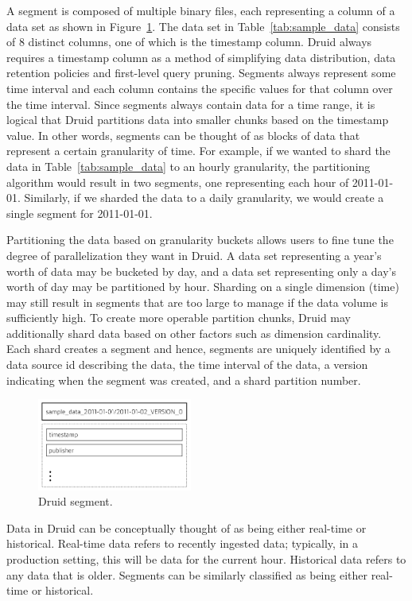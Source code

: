 \documentclass{vldb}
\begin{document}
A segment is composed of multiple binary files, each representing a
column of a data set as shown in Figure~\ref{fig:druid_segment}. The data set in Table~\ref{tab:sample_data} consists of 8 distinct
columns, one of which is the timestamp column. Druid always requires a
timestamp column as a method of simplifying data distribution, data retention policies and
first-level query pruning.  Segments always represent some time interval and each column
contains the specific values for that column over the time
interval. Since segments always contain data for a time range, it is
logical that Druid partitions data into smaller chunks based on the
timestamp value. In other words, segments can be thought of as blocks
of data that represent a certain granularity of time. For example, if
we wanted to shard the data in Table~\ref{tab:sample_data} to an hourly granularity, the
partitioning algorithm would result in two segments, one representing
each hour of 2011-01-01. Similarly, if we sharded the data to a daily
granularity, we would create a single segment for 2011-01-01.

Partitioning the data based on granularity buckets allows users to
fine tune the degree of parallelization they want in Druid. A data set
representing a year’s worth of data may be bucketed by day, and a data
set representing only a day’s worth of day may be partitioned by
hour. Sharding on a single dimension (time) may still result in segments that are too large to manage if the data volume is sufficiently high.
To create more operable partition chunks, Druid may
additionally shard data based on other factors such as dimension
cardinality. Each shard creates a segment and hence, segments are uniquely identified by a data source
id describing the data, the time interval of the data, a version
indicating when the segment was created, and a shard partition number.

\begin{figure}
\centering
\includegraphics[width = 2in]{druid_segment}
\caption{Druid segment.}
\label{fig:druid_segment}
\end{figure}

Data in Druid can be conceptually thought of as being either real-time
or historical. Real-time data refers to recently ingested data;
typically, in a production setting, this will be data for the current
hour. Historical data refers to any data that is older. Segments can
be similarly classified as being either real-time or historical.
\end{document}
